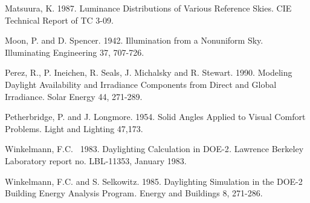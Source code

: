 Matsuura, K. 1987. Luminance Distributions of Various Reference Skies. CIE Technical Report of TC 3-09.

Moon, P. and D. Spencer. 1942. Illumination from a Nonuniform Sky. Illuminating Engineering 37, 707-726.

Perez, R., P. Ineichen, R. Seals, J. Michalsky and R. Stewart. 1990. Modeling Daylight Availability and Irradiance Components from Direct and Global Irradiance. Solar Energy 44, 271-289.

Petherbridge, P. and J. Longmore. 1954. Solid Angles Applied to Visual Comfort Problems. Light and Lighting 47,173.

Winkelmann, F.C.~ 1983. Daylighting Calculation in DOE-2\emph{.} Lawrence Berkeley Laboratory report no. LBL-11353, January 1983.

Winkelmann, F.C. and S. Selkowitz. 1985. Daylighting Simulation in the DOE-2 Building Energy Analysis Program\emph{.} Energy and Buildings 8, 271-286.

